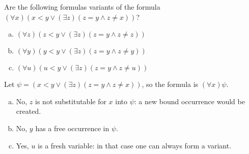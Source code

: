 \begin{problem}
    
    Are the following formulas variants of the formula $(\forall x)(x<y \vee (\exists z)(z=y \wedge z\ne x))$?
    \begin{enumerate}[(a)]
        \item $(\forall z)(z<y \vee (\exists z)(z=y \wedge z\ne z))$
        \item $(\forall y)(y<y \vee (\exists z)(z=y \wedge z\ne y))$
        \item $(\forall u)(u<y \vee (\exists z)(z=y \wedge z\ne u))$
    \end{enumerate}

    \begin{solution}
        Let $\psi=(x<y \vee (\exists z)(z=y \wedge z\ne x))$, so the formula is $(\forall x)\psi$.

        \begin{enumerate}[(a)]
            \item No, $z$ is not substitutable for $x$ into $\psi$: a new bound occurrence would be created.
            \item No, $y$ has a free occurrence in $\psi$.
            \item Yes, $u$ is a fresh variable: in that case one can always form a variant.
        \end{enumerate}        
        
    \end{solution}

\end{problem}


